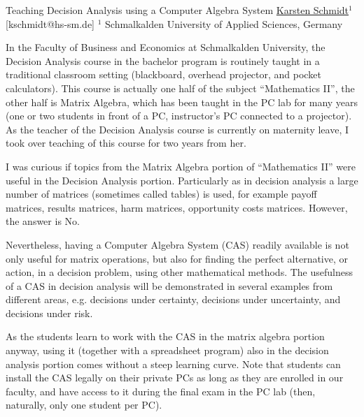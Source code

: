 


\begin{abstract_online}{Teaching Decision Analysis using a Computer Algebra System}{%
        \underline{Karsten Schmidt}$^{1}$}{[kschmidt@hs-sm.de]
        }{%
        $^1$ Schmalkalden University of Applied Sciences, Germany \newline}
    
In the Faculty of Business and Economics at Schmalkalden University, the Decision Analysis course in the bachelor program is routinely taught in a traditional classroom setting (blackboard, overhead projector, and pocket calculators). This course is actually one half of the subject “Mathematics II”, the other half is Matrix Algebra, which has been taught in the PC lab for many years (one or two students in front of a PC, instructor’s PC connected to a projector). As the teacher of the Decision Analysis course is currently on maternity leave, I took over teaching of this course for two years from her.

I was curious if topics from the Matrix Algebra portion of “Mathematics II” were useful in the Decision Analysis portion. Particularly as in decision analysis a large number of matrices (sometimes called tables) is used, for example payoff matrices, results matrices, harm matrices, opportunity costs matrices. However, the answer is No.

Nevertheless, having a Computer Algebra System (CAS) readily available is not only useful for matrix operations, but also for finding the perfect alternative, or action, in a decision problem, using other mathematical methods. The usefulness of a CAS in decision analysis will be demonstrated in several examples from different areas, e.g. decisions under certainty, decisions under uncertainty, and decisions under risk.

As the students learn to work with the CAS in the matrix algebra portion anyway, using it (together with a spreadsheet program) also in the decision analysis portion comes without a steep learning curve. Note that students can install the CAS legally on their private PCs as long as they are enrolled in our faculty, and have access to it during the final exam in the PC lab (then, naturally, only one student per PC).



\end{abstract_online}
    